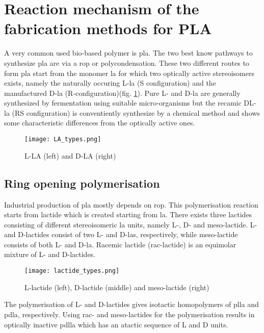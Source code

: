 \section{Reaction mechanism of the fabrication methods for PLA}

A very common used bio-based polymer is \gls{pla}. The two best know pathways to synthesize \gls{pla} are via a \gls{rop} or polycondensation. 
These two different routes to form \gls{pla} start from the monomer \gls{la} for which two optically active stereoisomers exists, namely the naturally occuring L-\gls{la} (S configuration) and the manufactured D-\gls{la} (R-configuration)(fig. \ref{fig:LA_types}). 
Pure L- and D-\gls{la} are generally synthesized by fermentation using suitable micro-organisms but the recamic DL-\gls{la} (RS configuration) is conventiently synthesize by a chemical method and shows some characteristic differences from the optically active ones.

\begin{figure}[ht]
    \centering
    \texttt{[image: LA\_types.png]}
    \caption{L-LA (left) and D-LA (right)}
    \label{fig:LA_types}
\end{figure}

\subsection{Ring opening polymerisation}

Industrial production of \gls{pla} mostly depends on \gls{rop}. This polymerisation reaction starts from lactide which is created starting from \gls{la}. 
There exists three lactides consisting of different stereoisomeric \gls{la} units, namely L-, D- and meso-lactide.  
L- and D-lactides consist of two L- and D-\gls{la}s, respectively, while meso-lactide consists of both L- and D-\gls{la}. Racemic lactide (rac-lactide) is an equimolar mixture of L- and D-lactides.

\begin{figure}[ht]
    \centering
    \texttt{[image: lactide\_types.png]}
    \caption{L-lactide (left), D-lactide (middle) and meso-lactide (right)}
    \label{fig:lactide_types}
\end{figure}

The polymerisation of L- and D-lactides gives isotactic homopolymers of \gls{plla} and \gls{pdla}, respectively. Using rac- and meso-lactides for the polymerisation results in optically inactive \gls{pdlla} which has an atactic sequence of L and D units.

